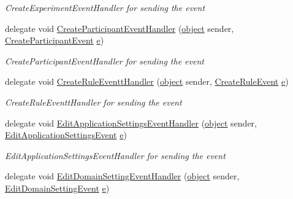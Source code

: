 \begin{DoxyCompactItemize}
\begin{DoxyCompactList}\small\item\em Create\+Experiment\+Event\+Handler for sending the event \end{DoxyCompactList}\item 
delegate void \hyperlink{namespace_web_analyzer_1_1_events_a0c2cd67965a3ab4b60d116945f0c6490}{Create\+Participant\+Event\+Handler} (\hyperlink{_u_i_2_h_t_m_l_resources_2js_2lib_2underscore_8min_8js_aae18b7515bb2bc4137586506e7c0c903}{object} sender, \hyperlink{class_web_analyzer_1_1_events_1_1_create_participant_event}{Create\+Participant\+Event} \hyperlink{_u_i_2_h_t_m_l_resources_2js_2lib_2bootstrap_8min_8js_ab5902775854a8b8440bcd25e0fe1c120}{e})
\begin{DoxyCompactList}\small\item\em Create\+Participant\+Event\+Handler for sending the event \end{DoxyCompactList}\item 
delegate void \hyperlink{namespace_web_analyzer_1_1_events_a411dcf2260875859f1e6d4b3c3e3b46b}{Create\+Rule\+Eventt\+Handler} (\hyperlink{_u_i_2_h_t_m_l_resources_2js_2lib_2underscore_8min_8js_aae18b7515bb2bc4137586506e7c0c903}{object} sender, \hyperlink{class_web_analyzer_1_1_events_1_1_create_rule_event}{Create\+Rule\+Event} \hyperlink{_u_i_2_h_t_m_l_resources_2js_2lib_2bootstrap_8min_8js_ab5902775854a8b8440bcd25e0fe1c120}{e})
\begin{DoxyCompactList}\small\item\em Create\+Rule\+Eventt\+Handler for sending the event \end{DoxyCompactList}\item 
delegate void \hyperlink{namespace_web_analyzer_1_1_events_a5fea12ab57b4d49c98080dae8ae699a6}{Edit\+Application\+Settings\+Event\+Handler} (\hyperlink{_u_i_2_h_t_m_l_resources_2js_2lib_2underscore_8min_8js_aae18b7515bb2bc4137586506e7c0c903}{object} sender, \hyperlink{class_web_analyzer_1_1_events_1_1_edit_application_settings_event}{Edit\+Application\+Settings\+Event} \hyperlink{_u_i_2_h_t_m_l_resources_2js_2lib_2bootstrap_8min_8js_ab5902775854a8b8440bcd25e0fe1c120}{e})
\begin{DoxyCompactList}\small\item\em Edit\+Application\+Settings\+Event\+Handler for sending the event \end{DoxyCompactList}\item 
delegate void \hyperlink{namespace_web_analyzer_1_1_events_a5fed3a7653709d0b4bd898915c660916}{Edit\+Domain\+Setting\+Event\+Handler} (\hyperlink{_u_i_2_h_t_m_l_resources_2js_2lib_2underscore_8min_8js_aae18b7515bb2bc4137586506e7c0c903}{object} sender, \hyperlink{class_web_analyzer_1_1_events_1_1_edit_domain_setting_event}{Edit\+Domain\+Setting\+Event} \hyperlink{_u_i_2_h_t_m_l_resources_2js_2lib_2bootstrap_8min_8js_ab5902775854a8b8440bcd25e0fe1c120}{e})

\end{DoxyCompactItemize}
